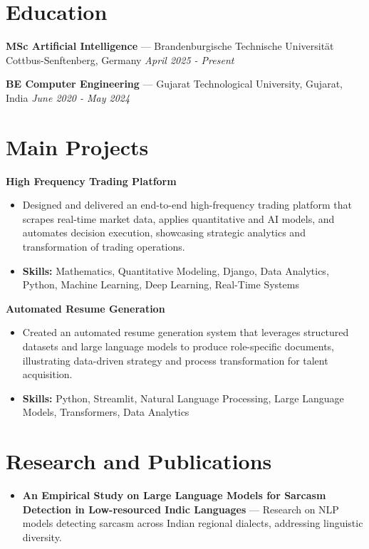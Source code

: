 \documentclass[a4paper,10pt]{article}
\begin{document}
\section*{Education}
\textbf{MSc Artificial Intelligence} — Brandenburgische Technische Universität Cottbus-Senftenberg, Germany \hfill \textit{April 2025 - Present}\par
\vspace{1.5pt}
\textbf{BE Computer Engineering} — Gujarat Technological University, Gujarat, India \hfill \textit{June 2020 - May 2024}\par

\section*{Main Projects}
\textbf{High Frequency Trading Platform}\par
\vspace{1pt}
\begin{itemize}
  \item Designed and delivered an end-to-end high-frequency trading platform that scrapes real-time market data, applies quantitative and AI models, and automates decision execution, showcasing strategic analytics and transformation of trading operations.
  \item \textbf{Skills:} Mathematics, Quantitative Modeling, Django, Data Analytics, Python, Machine Learning, Deep Learning, Real-Time Systems
\end{itemize}
\vspace{3pt}
\textbf{Automated Resume Generation}\par
\vspace{1pt}
\begin{itemize}
  \item Created an automated resume generation system that leverages structured datasets and large language models to produce role-specific documents, illustrating data-driven strategy and process transformation for talent acquisition.
  \item \textbf{Skills:} Python, Streamlit, Natural Language Processing, Large Language Models, Transformers, Data Analytics
\end{itemize}

\section*{Research and Publications}
\begin{itemize}
\item \textbf{An Empirical Study on Large Language Models for Sarcasm Detection in Low-resourced Indic Languages} — Research on NLP models detecting sarcasm across Indian regional dialects, addressing linguistic diversity.
\end{itemize}
\end{document}
